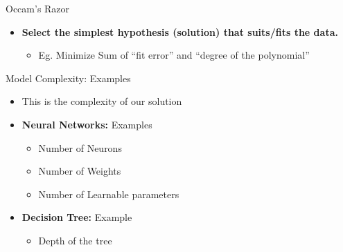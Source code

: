 \documentclass[aspectratio=169,14pt,usenames,dvipsnames]{beamer}
\begin{document}
\begin{frame}{Occam’s Razor}
\begin{itemize}

\item \alert{\textbf{Select the simplest hypothesis (solution) that suits/fits the data.}} 
 
\begin{itemize}
\item Eg. Minimize Sum of “fit error” and “degree of the polynomial”

\end{itemize}
\end{itemize}
\end{frame}

\begin{frame}{Model Complexity: Examples}
\begin{itemize}

\item This is the complexity of our solution
\item \alert{\textbf{Neural Networks:}} Examples 
 
\begin{itemize}
\item Number of Neurons 
\item Number of Weights 
\item Number of Learnable parameters

\end{itemize}
\end{itemize}

\begin{itemize}
\item \alert{\textbf{Decision Tree:}} Example
 
\begin{itemize}
\item Depth of the tree
\end{itemize}
\end{itemize}

\end{frame}
\end{document}
